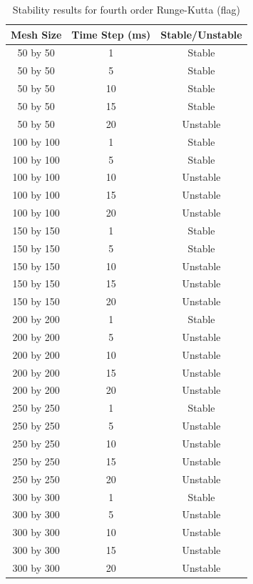 \begin{table}[tp]
   \begin{minipage}{\textwidth}
      \begin{center}
         \begin{tabular}{|c|c|c|}
         \hline
           Mesh Size & Time Step (ms) & Stable/Unstable\\
           \hline
           50 by 50 & 1 & Stable\\ \hline
           50 by 50 & 5 & Stable\\ \hline
           50 by 50 & 10 & Stable\\ \hline
           50 by 50 & 15 & Stable\\ \hline
           50 by 50 & 20 & Unstable\\ \hline
           100 by 100 & 1 & Stable\\ \hline
           100 by 100 & 5 & Stable\\ \hline
           100 by 100 & 10 & Unstable\\ \hline
           100 by 100 & 15 & Unstable\\ \hline
           100 by 100 & 20 & Unstable\\ \hline           
           150 by 150 & 1 & Stable\\ \hline
           150 by 150 & 5 & Stable\\ \hline
           150 by 150 & 10 & Unstable\\ \hline
           150 by 150 & 15 & Unstable\\ \hline
           150 by 150 & 20 & Unstable\\ \hline           
           200 by 200 & 1 & Stable\\ \hline
           200 by 200 & 5 & Unstable\\ \hline
           200 by 200 & 10 & Unstable\\ \hline
           200 by 200 & 15 & Unstable\\ \hline
           200 by 200 & 20 & Unstable\\ \hline           
           250 by 250 & 1 & Stable\\ \hline
           250 by 250 & 5 & Unstable\\ \hline
           250 by 250 & 10 & Unstable\\ \hline
           250 by 250 & 15 & Unstable\\ \hline
           250 by 250 & 20 & Unstable\\ \hline           
           300 by 300 & 1 & Stable\\ \hline
           300 by 300 & 5 & Unstable\\ \hline
           300 by 300 & 10 & Unstable\\ \hline
           300 by 300 & 15 & Unstable\\ \hline
           300 by 300 & 20 & Unstable\\ \hline
         \end{tabular}
      \end{center}
   \end{minipage}
   \caption{Stability results for fourth order Runge-Kutta (flag)}
   \label{tab:rk4 stability flag}
\end{table}

